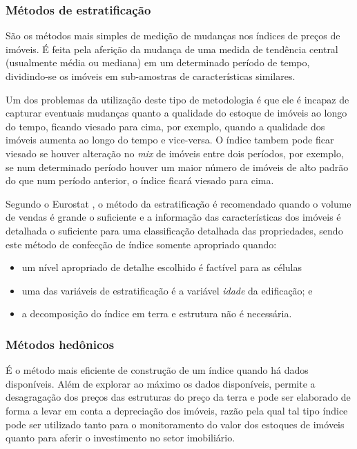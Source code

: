 \documentclass[
	12pt,				%
	oneside,			%
	a4paper,			%
	chapter=TITLE,		%
	section=TITLE,		%
	english,			%
	brazil				%
	]{abntex2}
\begin{document}
\begin{refsection}
\hypertarget{muxe9todos-de-estratificauxe7uxe3o}{%
\subsubsection{Métodos de estratificação}\label{muxe9todos-de-estratificauxe7uxe3o}}

São os métodos mais simples de medição de mudanças nos índices de preços de
imóveis. É feita pela aferição da mudança de uma medida de tendência central
(usualmente média ou mediana) em um determinado período de tempo, dividindo-se
os imóveis em sub-amostras de características similares.

Um dos problemas da utilização deste tipo de metodologia é que ele é incapaz
de capturar eventuais mudanças quanto a qualidade do estoque de imóveis ao longo
do tempo, ficando viesado para cima, por exemplo, quando a qualidade dos imóveis
aumenta ao longo do tempo e vice-versa. O índice tambem pode ficar viesado se
houver alteração no \emph{mix} de imóveis entre dois períodos, por exemplo, se num
determinado período houver um maior número de imóveis de alto padrão do que
num período anterior, o índice ficará viesado para cima.

Segundo o Eurostat \autocite*[158]{rppi}, o método da estratificação é recomendado
quando o volume de vendas é grande o suficiente e a informação das
características dos imóveis é detalhada o suficiente para uma classificação
detalhada das propriedades, sendo este método de confecção de índice somente
apropriado quando:
\begin{itemize}
\tightlist
\item
  um nível apropriado de detalhe escolhido é factível para as células
\item
  uma das variáveis de estratificação é a variável \emph{idade} da edificação; e
\item
  a decomposição do índice em terra e estrutura não é necessária.
\end{itemize}
\hypertarget{muxe9todos-heduxf4nicos}{%
\subsubsection{Métodos hedônicos}\label{muxe9todos-heduxf4nicos}}

É o método mais eficiente de construção de um índice quando há dados
disponíveis. Além de explorar ao máximo os dados disponíveis, permite a
desagragação dos preços das estruturas do preço da terra e pode ser elaborado de
forma a levar em conta a depreciação dos imóveis, razão pela qual tal tipo
índice pode ser utilizado tanto para o monitoramento do valor dos estoques de
imóveis quanto para aferir o investimento no setor imobiliário.


\end{refsection}
\end{document}
